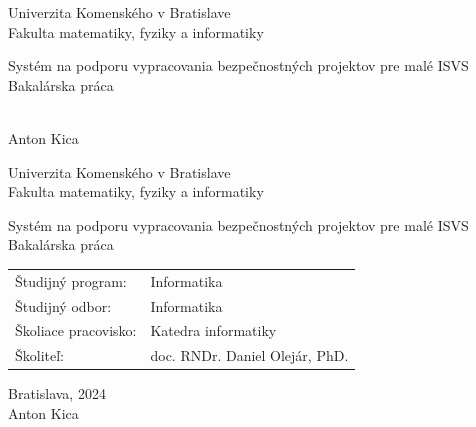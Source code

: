 \documentclass[12pt, twoside]{book}
\def\mfrok{2024}
\def\mfnazov{Systém na podporu vypracovania bezpečnostných projektov pre malé ISVS}
\def\mftyp{Bakalárska práca}
\def\mfautor{Anton Kica}
\def\mfskolitel{doc. RNDr. Daniel Olejár, PhD.}
\def\mfmiesto{Bratislava, \mfrok}
\def\mfodbor{Informatika}
\def\program{Informatika}
\def\mfpracovisko{Katedra informatiky}
\begin{document}
     
\frontmatter
\pagestyle{empty}


\begin{center}
\sc\large
Univerzita Komenského v Bratislave\\
Fakulta matematiky, fyziky a informatiky

\vfill

{\LARGE\mfnazov}\\
\mftyp
\end{center}

\vfill

{\sc\large 
\noindent \mfrok\\
\mfautor
}

\cleardoublepage



\noindent

\begin{center}
\sc  
\large
Univerzita Komenského v Bratislave\\
Fakulta matematiky, fyziky a informatiky

\vfill

{\LARGE\mfnazov}\\
\mftyp
\end{center}

\vfill

\noindent
\begin{tabular}{ll}
Študijný program: & \program \\
Študijný odbor: & \mfodbor \\
Školiace pracovisko: & \mfpracovisko \\
Školiteľ: & \mfskolitel \\
\end{tabular}

\vfill


\noindent \mfmiesto\\
\mfautor

\cleardoublepage



\newpage 
\setcounter{page}{3}

\end{document}
